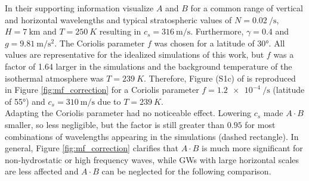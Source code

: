 In their supporting information \textcite[]{ern_directional_2017} visualize $A$ and $B$ for a common range of vertical and horizontal wavelengths and typical stratospheric values of $N=\SI{0.02}{\per\second}$, $H=\SI{7}{\kilo\meter}$ and $T=\SI{250}{K}$ resulting in $c_s = \SI{316}{\meter\per\second}$. Furthermore, $\gamma=0.4$ and $g=\SI{9.81}{\meter\per\second^2}$. The Coriolis parameter $f$ was chosen for a latitude of 30°. All values are representative for the idealized simulations of this work, but $f$ was a factor of 1.64 larger in the simulations and the background temperature of the isothermal atmosphere was $T=\SI{239}{K}$. Therefore, Figure (S1c) of \textcite[]{ern_directional_2017} is reproduced in Figure \ref{fig:mf_correction} for a Coriolis parameter $f=\SI{1.2e-4}{\per\second}$ (latitude of 55°) and $c_s = \SI{310}{\meter\per\second}$ due to $T=\SI{239}{K}$. \\
Adapting the Coriolis parameter had no noticeable effect. Lowering $c_s$ made $A \cdot B$ smaller, so less negligible, but the factor is still greater than $0.95$ for most combinations of wavelengths appearing in the simulations (dashed rectangle). In general, Figure \ref{fig:mf_correction} clarifies that $A \cdot B$ is much more significant for non-hydrostatic or high frequency waves, while GWs with large horizontal scales are less affected and $A \cdot B$ can be neglected for the following comparison.

